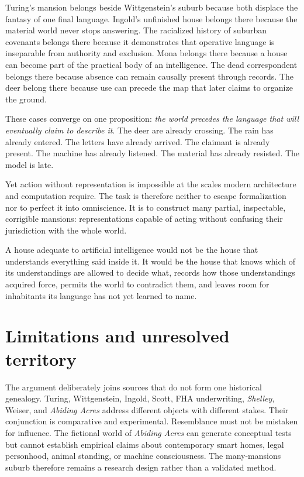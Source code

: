 \documentclass[11pt]{article}
\begin{document}
Turing's mansion belongs beside Wittgenstein's suburb because both displace the fantasy of one final language. Ingold's unfinished house belongs there because the material world never stops answering. The racialized history of suburban covenants belongs there because it demonstrates that operative language is inseparable from authority and exclusion. Mona belongs there because a house can become part of the practical body of an intelligence. The dead correspondent belongs there because absence can remain causally present through records. The deer belong there because use can precede the map that later claims to organize the ground.

These cases converge on one proposition: \emph{the world precedes the language that will eventually claim to describe it}. The deer are already crossing. The rain has already entered. The letters have already arrived. The claimant is already present. The machine has already listened. The material has already resisted. The model is late.

Yet action without representation is impossible at the scales modern architecture and computation require. The task is therefore neither to escape formalization nor to perfect it into omniscience. It is to construct many partial, inspectable, corrigible mansions: representations capable of acting without confusing their jurisdiction with the whole world.

A house adequate to artificial intelligence would not be the house that understands everything said inside it. It would be the house that knows which of its understandings are allowed to decide what, records how those understandings acquired force, permits the world to contradict them, and leaves room for inhabitants its language has not yet learned to name.

\section*{Limitations and unresolved territory}

The argument deliberately joins sources that do not form one historical genealogy. Turing, Wittgenstein, Ingold, Scott, FHA underwriting, \emph{Shelley}, Weiser, and \emph{Abiding Acres} address different objects with different stakes. Their conjunction is comparative and experimental. Resemblance must not be mistaken for influence. The fictional world of \emph{Abiding Acres} can generate conceptual tests but cannot establish empirical claims about contemporary smart homes, legal personhood, animal standing, or machine consciousness. The many-mansions suburb therefore remains a research design rather than a validated method.
\end{document}
